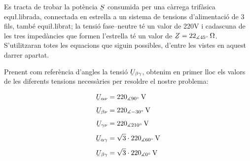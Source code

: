 \begin{exemple}
    Es tracta de trobar la pot\`{e}ncia $\cmplx{S}$ consumida per una c\`{a}rrega
    trif\`{a}sica equ{\l.l}ibrada, connectada en estrella a un sistema de tensions
    d'alimentaci\'{o}  de 3 fils, tamb\'{e} equi{\l.l}ibrat; la tensi\'{o} fase--neutre
    t\'{e} un valor de 220\unit{V} i cadascuna de les tres  imped\`{a}ncies
    que formen l'estrella t\'{e} un valor de $\cmplx{Z}=22_{\measuredangle
    45\degree}\unit{\ohm}$. S'utilitzaran totes les equacions que
    siguin possibles, d'entre les vistes en aquest darrer apartat.

    Prenent com refer\`{e}ncia d'angles la tensi\'{o}
    $\cmplx{U}_{\beta\gamma}$, obtenim en primer lloc els valors de
    les diferents tensions necess\`{a}ries per resoldre el nostre
    problema:

    \hfill
    \begin{minipage}[b]{7.5cm}
    \end{minipage}
    \hfill
    \begin{minipage}[b][5.7cm][t]{3.8cm}
    \begin{align*}
        \cmplx{U}_{\alpha\nu} &= 220_{\measuredangle 90\degree}\unit{V} \\[1ex]
        \cmplx{U}_{\beta\nu} &= 220_{\measuredangle -30\degree}\unit{V} \\[1ex]
        \cmplx{U}_{\gamma\nu} &= 220_{\measuredangle 210\degree}\unit{V} \\[1ex]
        \cmplx{U}_{\alpha\gamma} &= \sqrt{3}\cdot220_{\measuredangle 60\degree}\unit{V} \\[1ex]
        \cmplx{U}_{\beta\gamma} &= \sqrt{3}\cdot220_{\measuredangle 0\degree}\unit{V}
    \end{align*}
    \end{minipage}
    \hfill{}


\end{exemple}
